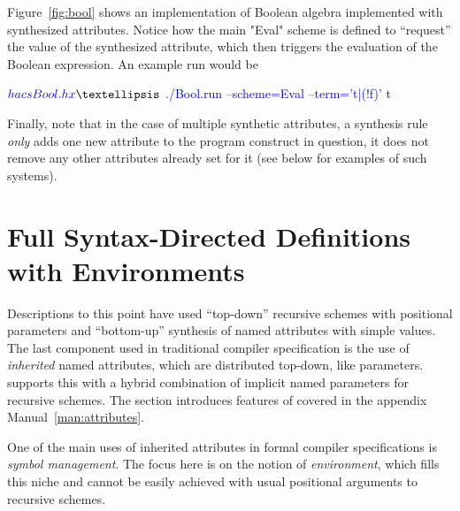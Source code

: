 \documentclass[11pt]{article} %
\begin{document}
\begin{example}\label{ex:bool}
  Figure~\ref{fig:bool} shows an implementation of Boolean algebra implemented with synthesized
  attributes. Notice how the main "Eval" scheme is defined to ``request'' the value of the
  synthesized attribute, which then triggers the evaluation of the Boolean expression. An example
  run would be
  \begin{code}[commandchars=\\\{\}]
$ \textcolor{blue}{hacs Bool.hx}
…
$ \textcolor{blue}{./Bool.run --scheme=Eval --term='t|(!f)'}
 t
  \end{code}
\end{example}

Finally, note that in the case of multiple synthetic attributes, a synthesis rule \emph{only} adds
one new attribute to the program construct in question, it does not remove any other attributes
already set for it (see below for examples of such systems). %


\section{Full Syntax-Directed Definitions with Environments}
\label{sec:sdd}

Descriptions to this point have used ``top-down'' recursive schemes with positional parameters and
``bottom-up'' synthesis of named attributes with simple values. The last component used in
traditional compiler specification is the use of \emph{inherited} named attributes, which are
distributed top-down, like parameters. \HAX supports this with a hybrid combination of implicit
named parameters for recursive schemes. The section introduces features of \HAX covered in the
appendix Manual~\ref{man:attributes}.

One of the main uses of inherited attributes in formal compiler specifications is \emph{symbol
  management}. The focus here is on the \HAX notion of \emph{environment}, which fills this niche
and cannot be easily achieved with usual positional arguments to recursive schemes.
\end{document}
